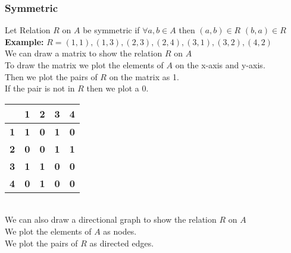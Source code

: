 \subsubsection{Symmetric}
Let Relation $R$ on $A$ be symmetric if $\forall a,b \in A$ then $(a,b) \in R$  $(b,a) \in R$ \\

\textbf{Example:}
$R ={(1,1),(1,3),(2,3),(2,4),(3,1),(3,2),(4,2)}$ \\
We can draw a matrix to show the relation $R$ on $A$ \\
To draw the matrix we plot the elements of $A$ on the x-axis and y-axis. \\
Then we plot the pairs of $R$ on the matrix as 1. \\
If the pair is not in $R$ then we plot a 0. \\

\begin{tabular}{|c|c|c|c|c|}
\hline
\multicolumn{1}{|c|}{\textbf{}} & \multicolumn{1}{c|}{\textbf{1}} & \multicolumn{1}{c|}{\textbf{2}} & \multicolumn{1}{c|}{\textbf{3}} & \multicolumn{1}{c|}{\textbf{4}} \\ \hline
\multicolumn{1}{|c|}{\textbf{1}} & \multicolumn{1}{c|}{\textbf{1}} & \multicolumn{1}{c|}{\textbf{0}} & \multicolumn{1}{c|}{\textbf{1}} & \multicolumn{1}{c|}{\textbf{0}} \\ \hline
\multicolumn{1}{|c|}{\textbf{2}} & \multicolumn{1}{c|}{\textbf{0}} & \multicolumn{1}{c|}{\textbf{0}} & \multicolumn{1}{c|}{\textbf{1}} & \multicolumn{1}{c|}{\textbf{1}} \\ \hline
\multicolumn{1}{|c|}{\textbf{3}} & \multicolumn{1}{c|}{\textbf{1}} & \multicolumn{1}{c|}{\textbf{1}} & \multicolumn{1}{c|}{\textbf{0}} & \multicolumn{1}{c|}{\textbf{0}} \\ \hline
\multicolumn{1}{|c|}{\textbf{4}} & \multicolumn{1}{c|}{\textbf{0}} & \multicolumn{1}{c|}{\textbf{1}} & \multicolumn{1}{c|}{\textbf{0}} & \multicolumn{1}{c|}{\textbf{0}} \\ \hline
\end{tabular} \\

We can also draw a directional graph to show the relation $R$ on $A$ \\
We plot the elements of $A$ as nodes. \\
We plot the pairs of $R$ as directed edges. \\
 \\

